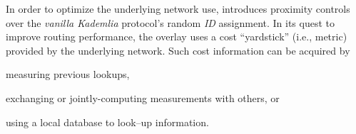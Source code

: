

In order to optimize the underlying network use,
\cite{KLKP2008} introduces proximity
controls over the \emph{vanilla Kademlia} 
protocol's random \emph{ID} assignment.
In its quest to improve routing performance, the overlay uses 
a cost ``yardstick'' (i.e., metric) provided by the underlying network.
Such cost information can be acquired by
\begin{inparaenum}
  \item measuring previous lookups,
  \item exchanging or jointly-computing measurements with 
	others, or 
  \item using a local database to look--up information.
\end{inparaenum}

